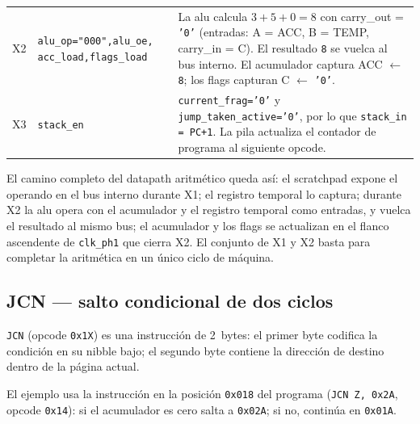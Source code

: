 \documentclass[%
    school=etsisi,%
    type=pfg,%
    degree=61CI,%
]{upm-report}
\begin{document}
\begin{longtable}{@{}p{1.2cm}p{4.2cm}p{\dimexpr\linewidth-5.4cm-4\tabcolsep\relax}@{}}
\addlinespace
X2 & \texttt{alu\_op="000",}\newline\texttt{alu\_oe, acc\_load,}\newline\texttt{flags\_load} &
    La \acrshort{alu} calcula $3 + 5 + 0 = 8$ con carry\_out =
    \texttt{'0'} (entradas: A = ACC, B = TEMP, carry\_in = C).
    El resultado \texttt{8} se vuelca al bus interno.
    El acumulador captura ACC $\leftarrow$ \texttt{8};
    los flags capturan C $\leftarrow$ \texttt{'0'}. \\
\addlinespace
X3 & \texttt{stack\_en} &
    \texttt{current\_frag='0'} y \texttt{jump\_taken\_active='0'},
    por lo que \texttt{stack\_in = PC+1}.
    La pila actualiza el contador de programa al siguiente opcode. \\
\end{longtable}

El camino completo del datapath aritmético queda así: el scratchpad
expone el operando en el bus interno durante X1; el registro temporal lo
captura; durante X2 la \acrshort{alu} opera con el acumulador y el
registro temporal como entradas, y vuelca el resultado al mismo bus; el
acumulador y los flags se actualizan en el flanco ascendente de
\texttt{clk\_ph1} que cierra X2.  El conjunto de X1 y X2 basta para
completar la aritmética en un único ciclo de máquina.

\subsection{JCN --- salto condicional de dos ciclos}

\texttt{JCN} (opcode \texttt{0x1X}) es una instrucción de 2~bytes:
el primer byte codifica la condición en su nibble bajo; el segundo byte
contiene la dirección de destino dentro de la página actual.

El ejemplo usa la instrucción en la posición \texttt{0x018} del programa
(\texttt{JCN~Z, 0x2A}, opcode \texttt{0x14}): si el acumulador es cero
salta a \texttt{0x02A}; si no, continúa en \texttt{0x01A}.
\end{document}
